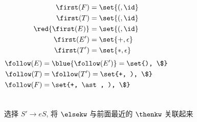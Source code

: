 \begin{frame}{}
  \begin{center}
    \begin{columns}
        
    \end{columns}

    \begin{columns}
        \begin{align*}
          \first(F) &= \set{(, \id} \\
          \first(T) &= \set{(, \id} \\
          \red{\first(E)} &= \set{(, \id} \\
          \first(E') &= \set{+, \epsilon} \\
          \first(T') &= \set{\ast, \epsilon}
        \end{align*}
        \begin{align*}
          \follow(E) &= \blue{\follow(E')} = \set{), \$} \\
          \follow(T) &= \follow(T') = \set{+, ), \$} \\
          \follow(F) &= \set{+, \ast, ), \$}
        \end{align*}
    \end{columns}
  \end{center}
\end{frame}

\begin{frame}{}
  \begin{center}

  \end{center}
\end{frame}

\begin{frame}{}
  \begin{center}

    \vspace{0.50cm}
    \vspace{0.50cm}

  \end{center}
\end{frame}

\begin{frame}{}


  \begin{center}
     选择 $S' \to eS$, 将 $\elsekw$ 与前面最近的 $\thenkw$ 关联起来
  \end{center}
\end{frame}

